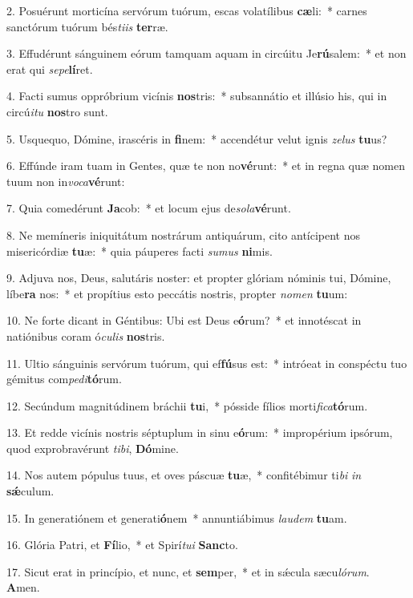 2. Posuérunt morticína servórum tuórum, escas volatílibus \textbf{cæ}li:~*  carnes sanctórum tuórum bés\textit{ti}\textit{is} \textbf{ter}ræ.\

3. Effudérunt sánguinem eórum tamquam aquam in circúitu Je\textbf{rú}salem:~*  et non erat qui \textit{se}\textit{pe}\textbf{lí}ret.\

4. Facti sumus oppróbrium vicínis \textbf{nos}tris:~*  subsannátio et illúsio his, qui in circú\textit{i}\textit{tu} \textbf{nos}tro sunt.\

5. Usquequo, Dómine, irascéris in \textbf{fi}nem:~*  accendétur velut ignis \textit{ze}\textit{lus} \textbf{tu}us?\

6. Effúnde iram tuam in Gentes, quæ te non no\textbf{vé}runt:~*  et in regna quæ nomen tuum non in\textit{vo}\textit{ca}\textbf{vé}runt:\

7. Quia comedérunt \textbf{Ja}cob:~*  et locum ejus de\textit{so}\textit{la}\textbf{vé}runt.\

8. Ne memíneris iniquitátum nostrárum antiquárum, cito antícipent nos misericórdiæ \textbf{tu}æ:~*  quia páuperes facti \textit{su}\textit{mus} \textbf{ni}mis.\

9. Adjuva nos, Deus, salutáris noster: et propter glóriam nóminis tui, Dómine, líbe\textbf{ra} nos:~*  et propítius esto peccátis nostris, propter \textit{no}\textit{men} \textbf{tu}um:\

10. Ne forte dicant in Géntibus: Ubi est Deus e\textbf{ó}rum?~*  et innotéscat in natiónibus coram ó\textit{cu}\textit{lis} \textbf{nos}tris.\

11. Ultio sánguinis servórum tuórum, qui ef\textbf{fú}sus est:~*  intróeat in conspéctu tuo gémitus com\textit{pe}\textit{di}\textbf{tó}rum.\

12. Secúndum magnitúdinem bráchii \textbf{tu}i,~*  pósside fílios morti\textit{fi}\textit{ca}\textbf{tó}rum.\

13. Et redde vicínis nostris séptuplum in sinu e\textbf{ó}rum:~*  impropérium ipsórum, quod exprobravérunt \textit{ti}\textit{bi}, \textbf{Dó}mine.\

14. Nos autem pópulus tuus, et oves páscuæ \textbf{tu}æ,~*  confitébimur ti\textit{bi} \textit{in} \textbf{sǽ}culum.\

15. In generatiónem et generati\textbf{ó}nem~*  annuntiábimus \textit{lau}\textit{dem} \textbf{tu}am.\

16. Glória Patri, et \textbf{Fí}lio,~*  et Spirí\textit{tu}\textit{i} \textbf{Sanc}to.\

17. Sicut erat in princípio, et nunc, et \textbf{sem}per,~*  et in sǽcula sæcu\textit{ló}\textit{rum}. \textbf{A}men.\

